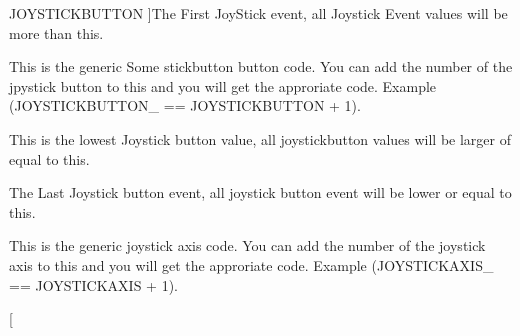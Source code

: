 \begin{Desc}
\begin{description}
{\hypertarget{classphys_1_1MetaCode_a3e501cbb5bf0f6f1fdb7211465bda8d8aaaa2af6a60a9cd7403aa4786ef1ea389}{
JOYSTICKBUTTON}
\label{da/dc9/classphys_1_1MetaCode_a3e501cbb5bf0f6f1fdb7211465bda8d8aaaa2af6a60a9cd7403aa4786ef1ea389}
}]The First JoyStick event, all Joystick Event values will be more than this. \item[{\em 
\hypertarget{classphys_1_1MetaCode_a3e501cbb5bf0f6f1fdb7211465bda8d8a88e7d7302a93326fdcc2181f96dc878e}{
JOYSTICKBUTTON\_\-FIRST}
\label{da/dc9/classphys_1_1MetaCode_a3e501cbb5bf0f6f1fdb7211465bda8d8a88e7d7302a93326fdcc2181f96dc878e}
}]This is the generic Some stickbutton button code. You can add the number of the jpystick button to this and you will get the approriate code. Example (JOYSTICKBUTTON\_ == JOYSTICKBUTTON + 1). \item[{\em 
\hypertarget{classphys_1_1MetaCode_a3e501cbb5bf0f6f1fdb7211465bda8d8a86e63516a8beca3310a2cecf77366e8d}{
JOYSTICKBUTTON\_\-1}
\label{da/dc9/classphys_1_1MetaCode_a3e501cbb5bf0f6f1fdb7211465bda8d8a86e63516a8beca3310a2cecf77366e8d}
}]This is the lowest Joystick button value, all joystickbutton values will be larger of equal to this. \item[{\em 
\hypertarget{classphys_1_1MetaCode_a3e501cbb5bf0f6f1fdb7211465bda8d8ab4e0e44b1cad95e292e9e436f3e59e0a}{
JOYSTICKAXIS}
\label{da/dc9/classphys_1_1MetaCode_a3e501cbb5bf0f6f1fdb7211465bda8d8ab4e0e44b1cad95e292e9e436f3e59e0a}
}]The Last Joystick button event, all joystick button event will be lower or equal to this. \item[{\em 
\hypertarget{classphys_1_1MetaCode_a3e501cbb5bf0f6f1fdb7211465bda8d8a25c2eaee4c0cbf93209042779b1e2e99}{
JOYSTICKAXIS\_\-FIRST}
\label{da/dc9/classphys_1_1MetaCode_a3e501cbb5bf0f6f1fdb7211465bda8d8a25c2eaee4c0cbf93209042779b1e2e99}
}]This is the generic joystick axis code. You can add the number of the joystick axis to this and you will get the approriate code. Example (JOYSTICKAXIS\_ == JOYSTICKAXIS + 1). \item[{\em 
}
\end{description}
\end{Desc}
